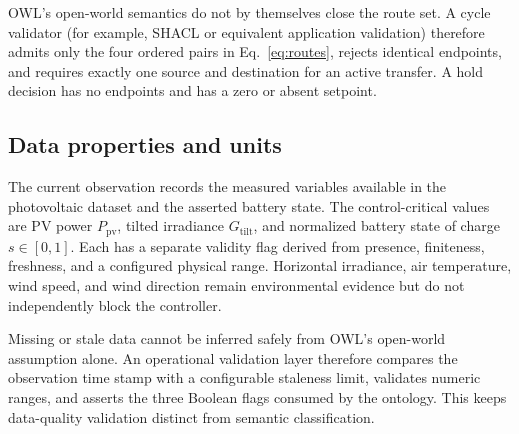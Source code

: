\documentclass[
	letterpaper,
	10pt,
	unnumberedsections,
	twoside,
]{LTJournalArticle}
\begin{document}
OWL's open-world semantics do not by themselves close the route set. A cycle validator (for example, SHACL or equivalent application validation) therefore admits only the four ordered pairs in Eq.~\eqref{eq:routes}, rejects identical endpoints, and requires exactly one source and destination for an active transfer. A hold decision has no endpoints and has a zero or absent setpoint.

\subsection{Data properties and units}

The current observation records the measured variables available in the photovoltaic dataset and the asserted battery state. The control-critical values are PV power $P_{\mathrm{pv}}$, tilted irradiance $G_{\mathrm{tilt}}$, and normalized battery state of charge $s\in[0,1]$. Each has a separate validity flag derived from presence, finiteness, freshness, and a configured physical range. Horizontal irradiance, air temperature, wind speed, and wind direction remain environmental evidence but do not independently block the controller.

Missing or stale data cannot be inferred safely from OWL's open-world assumption alone. An operational validation layer therefore compares the observation time stamp with a configurable staleness limit, validates numeric ranges, and asserts the three Boolean flags consumed by the ontology. This keeps data-quality validation distinct from semantic classification.
\end{document}
